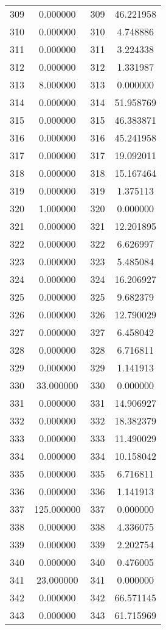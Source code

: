 \documentclass[12pt]{article}
\begin{document}
\begin{longtable}{@{}cccc@{}}
309 & 0.000000 & 309 & 46.221958 \\
310 & 0.000000 & 310 & 4.748886 \\
311 & 0.000000 & 311 & 3.224338 \\
312 & 0.000000 & 312 & 1.331987 \\
313 & 8.000000 & 313 & 0.000000 \\
314 & 0.000000 & 314 & 51.958769 \\
315 & 0.000000 & 315 & 46.383871 \\
316 & 0.000000 & 316 & 45.241958 \\
317 & 0.000000 & 317 & 19.092011 \\
318 & 0.000000 & 318 & 15.167464 \\
319 & 0.000000 & 319 & 1.375113 \\
320 & 1.000000 & 320 & 0.000000 \\
321 & 0.000000 & 321 & 12.201895 \\
322 & 0.000000 & 322 & 6.626997 \\
323 & 0.000000 & 323 & 5.485084 \\
324 & 0.000000 & 324 & 16.206927 \\
325 & 0.000000 & 325 & 9.682379 \\
326 & 0.000000 & 326 & 12.790029 \\
327 & 0.000000 & 327 & 6.458042 \\
328 & 0.000000 & 328 & 6.716811 \\
329 & 0.000000 & 329 & 1.141913 \\
330 & 33.000000 & 330 & 0.000000 \\
331 & 0.000000 & 331 & 14.906927 \\
332 & 0.000000 & 332 & 18.382379 \\
333 & 0.000000 & 333 & 11.490029 \\
334 & 0.000000 & 334 & 10.158042 \\
335 & 0.000000 & 335 & 6.716811 \\
336 & 0.000000 & 336 & 1.141913 \\
337 & 125.000000 & 337 & 0.000000 \\
338 & 0.000000 & 338 & 4.336075 \\
339 & 0.000000 & 339 & 2.202754 \\
340 & 0.000000 & 340 & 0.476005 \\
341 & 23.000000 & 341 & 0.000000 \\
342 & 0.000000 & 342 & 66.571145 \\
343 & 0.000000 & 343 & 61.715969 \\

\end{longtable}
\end{document}
